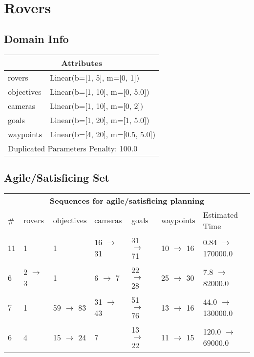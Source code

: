 \documentclass{article}
\begin{document}
                            \newpage \section{Rovers}
                    \subsection*{Domain Info}

                    \begin{center}
                    \begin{tabular}{@{}p{}p{}@{}}
                    \multicolumn{2}{c}{\bf \large Attributes}\\\midrule
                    rovers & Linear(b=[1, 5], m=[0, 1])\\
objectives & Linear(b=[1, 10], m=[0, 5.0])\\
cameras & Linear(b=[1, 10], m=[0, 2])\\
goals & Linear(b=[1, 20], m=[1, 5.0])\\
waypoints & Linear(b=[4, 20], m=[0.5, 5.0])
                    
                     \\\midrule
                    \multicolumn{2}{l}{Duplicated Parameters Penalty: 100.0}
                    \end{tabular}
                    \end{center}
                
                         \subsection*{Agile/Satisficing Set}

                        \begin{center}
                        \begin{tabular}{@{}l|l|l|l|l|l|l@{}}
                        \multicolumn{7}{c}{\bf \large Sequences for agile/satisficing planning}\\
                        \# & rovers & objectives & cameras & goals & waypoints & Estimated Time\\\midrule
                        11&1&1&16 $\rightarrow$ 31&31 $\rightarrow$ 71&10 $\rightarrow$ 16&0.84 $\rightarrow$ 170000.0\\
6&2 $\rightarrow$ 3&1&6 $\rightarrow$ 7&22 $\rightarrow$ 28&25 $\rightarrow$ 30&7.8 $\rightarrow$ 82000.0\\
7&1&59 $\rightarrow$ 83&31 $\rightarrow$ 43&51 $\rightarrow$ 76&13 $\rightarrow$ 16&44.0 $\rightarrow$ 130000.0\\
6&4&15 $\rightarrow$ 24&7&13 $\rightarrow$ 22&11 $\rightarrow$ 15&120.0 $\rightarrow$ 69000.0
                        \end{tabular}
                        \end{center}
                    
\end{document}
